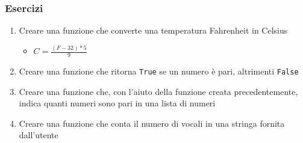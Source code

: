 \begin{exerciseframe}
    \frametitle{Esercizi}

    \begin{enumerate}
        \item Creare una funzione che converte una temperatura Fahrenheit in Celsius
        \begin{itemize}
            \item $C = \frac{(F - 32) * 5}{9}$
        \end{itemize}
        \pause
        \bigskip
        \item Creare una funzione che ritorna \texttt{True} se un numero è pari, altrimenti \texttt{False}
        \pause
        \bigskip
        \item Creare una funzione che, con l'aiuto della funzione creata precedentemente, indica quanti numeri sono pari in una lista di numeri
        \pause
        \bigskip
        \item Creare una funzione che conta il numero di vocali in una stringa fornita dall'utente
    \end{enumerate}
\end{exerciseframe}

